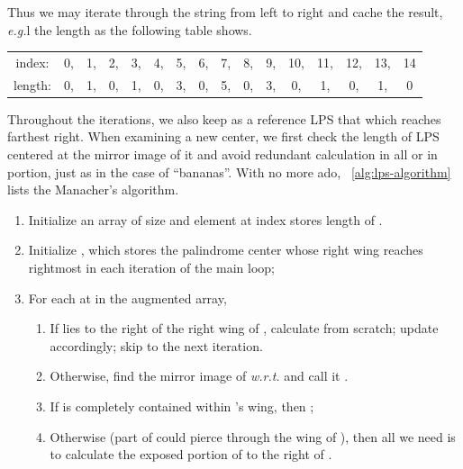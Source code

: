 Thus we may iterate through the string from left to right and cache the result, \textit{e.g.}l
the length as the following table shows.
\begin{center}
    \begin{tabular}{cccccccccccccccc}
        index:&0,&1,&2,&3,&4,&5,&6,&7,&8,&9,&10,&11,&12,&13,&14\\
        length:&0,&1,&0,&1,&0,&3,&0,&5,&0,&3,&0,&1,&0,&1,&0
    \end{tabular}
\end{center}
Throughout the iterations, we also keep as a reference LPS that which reaches farthest right.
When examining a new center, we first check the length of LPS centered at the mirror image of it
and avoid redundant calculation in all or in portion, just as in the case of ``bananas''.
With no more ado, ~\autoref{alg:lps-algorithm} lists the Manacher's algorithm.

\begin{alisting}[htb]
    \caption{\label{alg:lps-algorithm}
    Algorithm for calculating the length of LPS based on Manacher's algorithm}
    \begin{enumerate}
        \item Initialize an array  of size  and element at index 
        stores length of .
        \item Initialize , which stores the palindrome center whose right wing
        reaches rightmost in each iteration of the main loop;
        \item For each  at  in the augmented array,
        \begin{enumerate}[label={\roman*:}]
            \item If  lies to the right of the right wing of ,
            calculate  from scratch;
            update  accordingly;
            skip to the next iteration.
            \item Otherwise, find the mirror image of 
            \textit{w.r.t.}  and call it .
            \item If  is completely contained within 's wing,
            then ;
            \item Otherwise (part of  could pierce through
            the wing of ),
            then all we need is to calculate the exposed portion of  to the right of
            .
        \end{enumerate}
    \end{enumerate}
\end{alisting}


